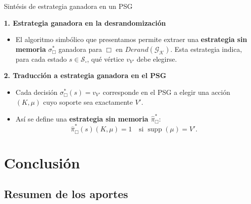 \documentclass{beamer}
\newcommand{\St}{\mathcal{S}}
\newcommand{\cuad}{\square}
\newcommand{\Gk}{\mathcal{G}_\mathcal{K}}
\newcommand{\W}{\mathcal{W}}
\newcommand{\DGk}{Derand(\Gk)}
\begin{document}
\begin{frame}{Sint\'esis de estrategia ganadora en un PSG}

	{\small
		\textbf{1. Estrategia ganadora en la desrandomización}
		\begin{itemize}
			\pause
			\item El algoritmo simbólico que presentamos permite extraer una \textbf{estrategia
				      sin memoria} $\sigma^{*}_{\Box}$ ganadora para $\Box$ en $\DGk$. Esta
			      estrategia indica, para cada estado $s \in \St_\cuad$, qué vértice $v_{V'}$
			      debe elegirse.
		\end{itemize}

		\medskip
		\pause

		\textbf{2. Traducción a estrategia ganadora en el PSG}
		\begin{itemize}
			\pause
			\item Cada decisión $\sigma^{*}_{\Box}(s) = v_{V'}$ corresponde en el PSG a elegir
			      una acción $(K,\mu)$ cuyo soporte sea exactamente $V'$. \pause
			\item Así se define una \textbf{estrategia sin memoria $\widehat{\pi}^{*}_{\Box}$}:
			      \[
				      \widehat{\pi}^{*}_{\Box}(s)(K,\mu)=1
				      \quad \text{si } \operatorname{supp}(\mu)=V'.
			      \]
		\end{itemize}
	}

\end{frame}

\section{Conclusi\'on}

\subsection{Resumen de los aportes}
\end{document}

